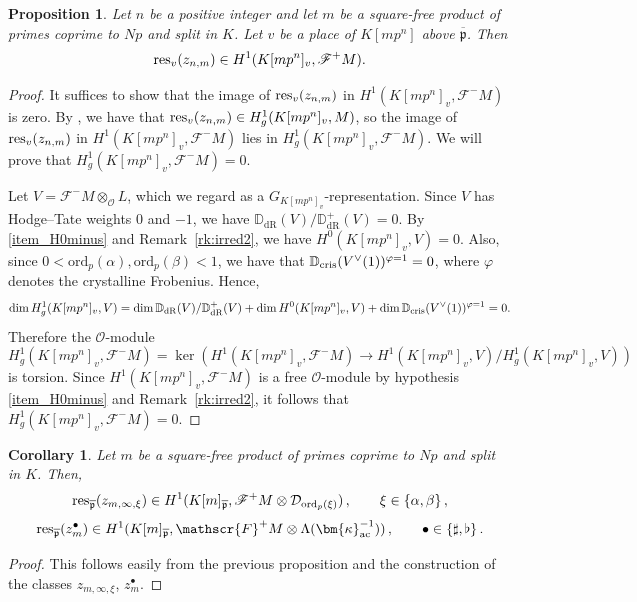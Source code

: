 \documentclass{amsart}
\numberwithin{equation}{section}
\newtheorem{proposition}[theorem]{Proposition}
\newtheorem{corollary}[theorem]{Corollary}
\newcommand{\frk}{\mathfrak}
\newcommand{\DD}{\mathbb{D}}
\newcommand{\ord}{\mathrm{ord}}
\newcommand{\ac}{\textup{ac}}
\newcommand{\res}{\textup{res}}
\newcommand{\Dcris}{\mathbb{D}_{\rm cris}}
\newcommand{\DdR}{\DD_{\mathrm{dR}}}
\newcommand{\cD}{\mathcal{D}}
\begin{document}
\begin{proposition}\label{prop:verify-local}
    Let $n$ be a positive integer and let $m$ be a square-free product of primes coprime to $Np$ and split in $K$. Let $v$ be a place of $K[mp^n]$ above $\overline{\frk{p}}$. Then
    \[
    \res_v(z_{n,m})\in H^1(K[mp^n]_v,\mathscr{F}^+M).
    \]
\end{proposition}
\begin{proof}
    It suffices to show that the image of $\res_v(z_{n,m})$ in $H^1(K[mp^n]_v,\mathscr{F}^-M)$ is zero. By \cite[Thm.~5.9]{NN16}, we have that $\res_v(z_{n,m})\in H^1_g(K[mp^n]_v,M)$, so the image of $\res_v(z_{n,m})$ in $H^1(K[mp^n]_v,\mathscr{F}^-M)$ lies in $H^1_g(K[mp^n]_v,\mathscr{F}^-M)$. We will prove that $H^1_g(K[mp^n]_v,\mathscr{F}^-M)=0$.
    
    Let $V=\mathscr{F}^-M\otimes_{\mathcal{O}}L$, which we regard as a $G_{K[mp^n]_v}$-representation. Since $V$ has Hodge--Tate weights $0$ and $-1$, we have $\DdR(V)/\DdR^+(V)=0$. By \eqref{item_H0minus} and Remark~\ref{rk:irred2}, we have $H^0(K[mp^n]_v,V)=0$. Also, since $0<\ord_p(\alpha),\ord_p(\beta)<1$, we have that $\Dcris(V^\vee(1))^{\varphi=1}=0$, where $\varphi$ denotes the crystalline Frobenius. Hence,
    \[
    \dim H^1_g(K[mp^n]_v,V)=\dim \DdR(V)/\DdR^+(V)+\dim H^0(K[mp^n]_v,V) +\dim \Dcris(V^\vee(1))^{\varphi=1}=0. 
    \]
    Therefore the $\mathcal{O}$-module
    \[
    H^1_g(K[mp^n]_v,\mathscr{F}^-M)=\ker\left(H^1(K[mp^n]_v,\mathscr{F}^-M)\longrightarrow H^1(K[mp^n]_v,V)/H^1_g(K[mp^n]_v,V)\right)
    \]
    is torsion. Since $H^1(K[mp^n]_v,\mathscr{F}^-M)$ is a free $\mathcal{O}$-module by hypothesis \eqref{item_H0minus} and Remark~\ref{rk:irred2}, it follows that $H^1_g(K[mp^n]_v,\mathscr{F}^-M)=0$.
\end{proof}

\begin{corollary}\label{cor:F+}
    Let $m$ be a square-free product of primes coprime to $Np$ and split in $K$. Then,
    \[
    \res_{\overline{\frk{p}}}(z_{m,\infty,\xi})\in H^1(K[m]_{\overline{\frk{p}}},\mathscr{F}^+M\otimes\cD_{\ord_p(\xi)})\,,\qquad  \xi\in\lbrace \alpha,\beta\rbrace\,,
    \]
    \[
    \res_{\overline{\frk{p}}}(z_{m}^\bullet)\in H^1(K[m]_{\overline{\frk{p}}},\mathscr{F}^+M\otimes\Lambda(\bm{\kappa}_{\ac}^{-1}))\,,\qquad \bullet\in\lbrace \sharp,\flat\rbrace\,.
    \]
\end{corollary}
\begin{proof}
    This follows easily from the previous proposition and the construction of the classes $z_{m,\infty,\xi}$, $z_{m}^\bullet$.
\end{proof}
\end{document}

